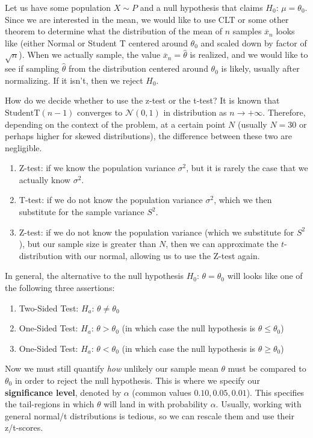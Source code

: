   Let us have some population $X \sim P$ and a null hypothesis that claims $H_0 : \, \mu = \theta_0$. Since we are interested in the mean, we would like to use CLT or some other theorem to determine what the distribution of the mean of $n$ samples $\overline{x}_n$ looks like (either Normal or Student T centered around $\theta_0$ and scaled down by factor of $\sqrt{n}$). When we actually sample, the value $\overline{x}_n = \hat{\theta}$ is realized, and we would like to see if sampling $\hat{\theta}$ from the distribution centered around $\theta_0$ is likely, usually after normalizing. If it isn't, then we reject $H_0$. 

  How do we decide whether to use the z-test or the t-test? It is known that $\mathrm{StudentT}(n-1)$ converges to $\mathcal{N}(0, 1)$ in distribution as $n \rightarrow +\infty$. Therefore, depending on the context of the problem, at a certain point $N$ (usually $N = 30$ or perhaps higher for skewed distributions), the difference between these two are negligible. 
  \begin{enumerate}
    \item Z-test: if we know the population variance $\sigma^2$, but it is rarely the case that we actually know $\sigma^2$. 
    \item T-test: if we do not know the population variance $\sigma^2$, which we then substitute for the sample variance $S^2$. 
    \item Z-test: if we do not know the population variance (which we substitute for $S^2$), but our sample size is greater than $N$, then we can approximate the $t$-distribution with our normal, allowing us to use the Z-test again. 
  \end{enumerate}

  In general, the alternative to the null hypothesis $H_0 : \, \theta = \theta_0$ will looks like one of the following three assertions: 
  \begin{enumerate}
    \item Two-Sided Test: $H_a : \, \theta \neq \theta_0$ 
    \item One-Sided Test: $H_a : \, \theta > \theta_0$ (in which case the null hypothesis is $\theta \leq \theta_0$) 
    \item One-Sided Test: $H_a : \, \theta < \theta_0$ (in which case the null hypothesis is $\theta \geq \theta_0$) 
  \end{enumerate}

  Now we must still quantify \textit{how} unlikely our sample mean $\theta$ must be compared to $\theta_0$ in order to reject the null hypothesis. This is where we specify our \textbf{significance level}, denoted by $\alpha$ (common values $0.10, 0.05, 0.01$). This specifies the tail-regions in which $\theta$ will land in with probability $\alpha$. Usually, working with general normal/t distributions is tedious, so we can rescale them and use their z/t-scores. 

